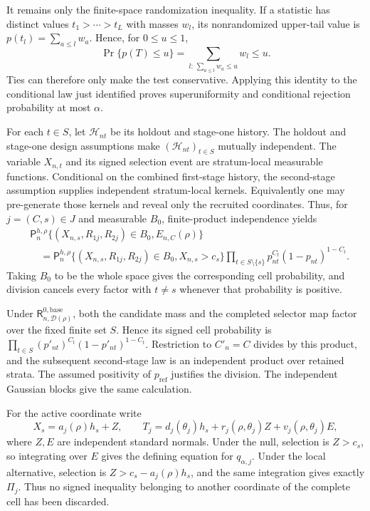 It remains only the finite-space randomization inequality.  If a statistic has distinct values \(t_1>\cdots>t_L\) with masses \(w_l\), its nonrandomized upper-tail value is \(p(t_l)=\sum_{a\le l}w_a\).  Hence, for \(0\le u\le1\),
\[
\Pr\{p(T)\le u\}
=\sum_{l:\,\sum_{a\le l}w_a\le u}w_l\le u.
\]
Ties can therefore only make the test conservative.  Applying this identity to the conditional law just identified proves superuniformity and conditional rejection probability at most \(\alpha\).

For each \(t\in S\), let \(\mathcal H_{nt}\) be its holdout and stage-one history.  The holdout and stage-one design assumptions make \((\mathcal H_{nt})_{t\in S}\) mutually independent.  The variable \(X_{n,t}\) and its signed selection event are stratum-local measurable functions.  Conditional on the combined first-stage history, the second-stage assumption supplies independent stratum-local kernels.  Equivalently one may pre-generate those kernels and reveal only the recruited coordinates.  Thus, for \(j=(C,s)\in J\) and measurable \(B_0\), finite-product independence yields
\[
\begin{aligned}
&\mathsf P_n^{h,\rho}\{(X_{n,s},R_{1j},R_{2j})\in B_0,E_{n,C}(\rho)\}\\
&\quad=\mathsf P_n^{h,\rho}\{(X_{n,s},R_{1j},R_{2j})\in B_0,X_{n,s}>c_s\}
\prod_{t\in S\setminus\{s\}}p_{nt}^{C_t}(1-p_{nt})^{1-C_t}.
\end{aligned}
\]
Taking \(B_0\) to be the whole space gives the corresponding cell probability, and division cancels every factor with \(t\ne s\) whenever that probability is positive.

Under \(\mathsf R_{n,\mathcal D(\rho)}^{0,\mathrm{base}}\), both the candidate mass and the completed selector map factor over the fixed finite set \(S\).  Hence its signed cell probability is \(\prod_{t\in S}(p'_{nt})^{C_t}(1-p'_{nt})^{1-C_t}\).  Restriction to \(C'_n=C\) divides by this product, and the subsequent second-stage law is an independent product over retained strata.  The assumed positivity of \(p_{\mathrm{ref}}\) justifies the division.  The independent Gaussian blocks give the same calculation.

For the active coordinate write
\[
X_s=a_j(\rho)h_s+Z,
\qquad
T_j=d_j(\theta_j)h_s+r_j(\rho,\theta_j)Z+v_j(\rho,\theta_j)E,
\]
where \(Z,E\) are independent standard normals.  Under the null, selection is \(Z>c_s\), so integrating over \(E\) gives the defining equation for \(q_{\alpha,j}\).  Under the local alternative, selection is \(Z>c_s-a_j(\rho)h_s\), and the same integration gives exactly \(\Pi_j\).  Thus no signed inequality belonging to another coordinate of the complete cell has been discarded.

